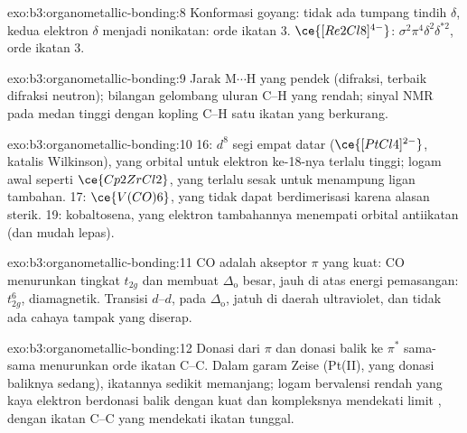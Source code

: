 \begin{solution}{exo:b3:organometallic-bonding:8}
Konformasi goyang: tidak ada tumpang tindih $\delta$, kedua elektron $\delta$ menjadi nonikatan: orde ikatan 3. $\ce{[Re2Cl8]^{4-}}$:
$\sigma^2\pi^4\delta^2\delta^{\ast2}$, orde ikatan 3.
\end{solution}

\begin{solution}{exo:b3:organometallic-bonding:9}
Jarak M$\cdots$H yang pendek (difraksi, terbaik difraksi neutron); bilangan gelombang uluran C--H
yang rendah; sinyal NMR pada medan tinggi dengan kopling C--H satu ikatan yang berkurang.
\end{solution}

\begin{solution}{exo:b3:organometallic-bonding:10}
16: $d^8$ segi empat datar ($\ce{[PtCl4]^{2-}}$, katalis Wilkinson), yang orbital untuk elektron ke-18-nya
terlalu tinggi;  logam awal seperti $\ce{Cp2ZrCl2}$, yang terlalu sesak untuk menampung ligan
tambahan. 17: $\ce{V(CO)6}$, yang tidak dapat berdimerisasi karena alasan sterik. 19: kobaltosena,
yang elektron tambahannya menempati orbital antiikatan (dan mudah lepas).
\end{solution}

\begin{solution}{exo:b3:organometallic-bonding:11}
CO adalah akseptor $\pi$ yang kuat: CO menurunkan tingkat $t_{2g}$ dan membuat $\Delta_{\mathrm o}$ besar, jauh di atas
energi pemasangan: $t_{2g}^6$, diamagnetik. Transisi $d$--$d$, pada $\Delta_{\mathrm o}$, jatuh di daerah ultraviolet,
dan tidak ada cahaya tampak yang diserap.
\end{solution}

\begin{solution}{exo:b3:organometallic-bonding:12}
Donasi dari $\pi$ dan donasi balik ke $\pi^*$ sama-sama menurunkan orde ikatan C--C. Dalam garam
Zeise (Pt(II), yang donasi baliknya sedang), ikatannya sedikit memanjang; logam bervalensi rendah
yang kaya elektron berdonasi balik dengan kuat dan kompleksnya mendekati limit
, dengan ikatan C--C yang mendekati ikatan tunggal.
\end{solution}

